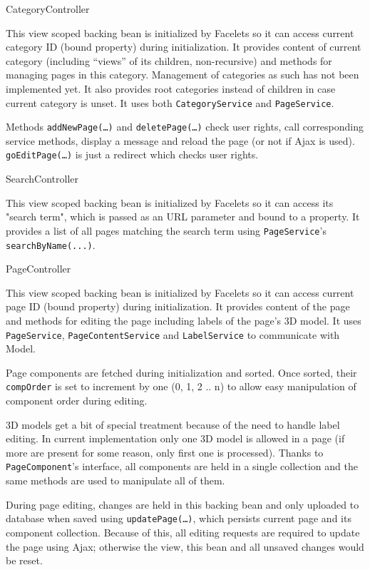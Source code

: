 \secc CategoryController

This view scoped backing bean is initialized by Facelets so it can access current category ID (bound property) during initialization. It provides content of current category (including “views” of its children, non-recursive) and methods for managing pages in this category. Management of categories as such has not been implemented yet. It also provides root categories instead of children in case current category is unset. It uses both {\tt CategoryService} and {\tt PageService}.

Methods {\tt addNewPage(…)} and {\tt deletePage(…)} check user rights, call corresponding service methods, display a message and reload the page (or not if Ajax is used). {\tt goEditPage(…)} is just a redirect which checks user rights.

\secc SearchController

This view scoped backing bean is initialized by Facelets so it can access its "search term", which is passed as an URL parameter and bound to a property. It provides a list of all pages matching the search term using {\tt PageService}'s {\tt searchByName(...)}.

\secc PageController

This view scoped backing bean is initialized by Facelets so it can access current page ID (bound property) during initialization. It provides content of the page and methods for editing the page including labels of the page’s 3D model. It uses {\tt PageService}, {\tt PageContentService} and {\tt LabelService} to communicate with Model.

Page components are fetched during initialization and sorted. Once sorted, their {\tt compOrder} is set to increment by one (0, 1, 2 .. n) to allow easy manipulation of component order during editing.

3D models get a bit of special treatment because of the need to handle label editing. In current implementation only one 3D model is allowed in a page (if more are present for some reason, only first one is processed).  Thanks to {\tt PageComponent}’s interface, all components are held in a single collection and the same methods are used to manipulate all of them.

During page editing, changes are held in this backing bean and only uploaded to database when saved using {\tt updatePage(…)}, which persists current page and its component collection. Because of this, all editing requests are required to update the page using Ajax; otherwise the view, this bean and all unsaved changes would be reset.

